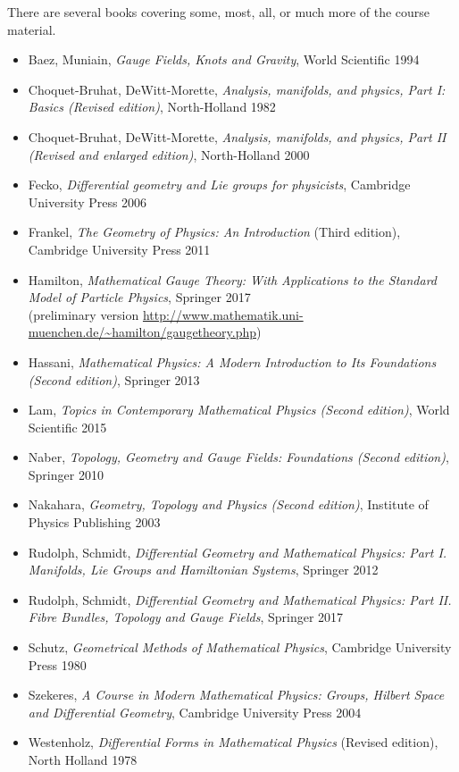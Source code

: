 
There are several books covering some, most, all, or much more of the course material.

\begin{itemize}
\item Baez, Muniain, \textit{Gauge Fields, Knots and Gravity}, World Scientific 1994
\item Choquet-Bruhat, DeWitt-Morette, \textit{Analysis, manifolds, and physics, Part I: Basics (Revised edition)}, North-Holland 1982
\item Choquet-Bruhat, DeWitt-Morette, \textit{Analysis, manifolds, and physics, Part II (Revised and enlarged edition)}, North-Holland 2000
\item Fecko, \textit{Differential geometry and Lie groups for physicists}, Cambridge University Press 2006
\item Frankel, \textit{The Geometry of Physics: An Introduction} (Third edition),  Cambridge University Press 2011
\item Hamilton, \textit{Mathematical Gauge Theory: With Applications to the Standard Model of Particle Physics}, Springer 2017\\
(preliminary version \url{http://www.mathematik.uni-muenchen.de/~hamilton/gaugetheory.php})
\item Hassani, \textit{Mathematical Physics: A Modern Introduction to Its Foundations (Second edition)}, Springer 2013
\item Lam, \textit{Topics in Contemporary Mathematical Physics (Second edition)}, World Scientific 2015
\item Naber, \textit{Topology, Geometry and Gauge Fields: Foundations (Second edition)}, Springer 2010
\item Nakahara, \textit{Geometry, Topology and Physics (Second edition)}, Institute of Physics Publishing 2003
\item Rudolph, Schmidt, \textit{Differential Geometry and Mathematical Physics: Part I. Manifolds, Lie Groups and Hamiltonian Systems}, Springer 2012
\item Rudolph, Schmidt, \textit{Differential Geometry and Mathematical Physics: Part II. Fibre Bundles, Topology and Gauge Fields}, Springer 2017
\item Schutz, \textit{Geometrical Methods of Mathematical Physics}, Cambridge University Press 1980
\item Szekeres, \textit{A Course in Modern Mathematical Physics: Groups, Hilbert Space and Differential Geometry}, Cambridge University Press 2004
\item Westenholz, \textit{Differential Forms in Mathematical Physics} (Revised edition), North Holland 1978 
\end{itemize}

